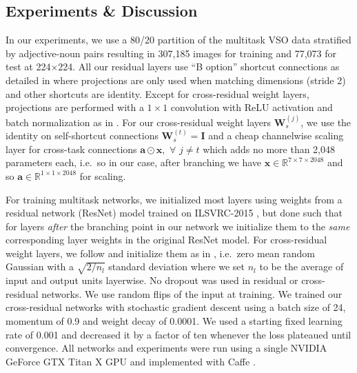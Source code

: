 \documentclass{sig-alternate-05-2015}
\newcommand{\mb}{\mathbf}
\begin{document}
\subsection{Experiments \& Discussion}
\label{ssec:experiments}

In our experiments, we use a 80/20 partition of the multitask VSO data stratified by adjective-noun pairs resulting in 307,185 images for training and 77,073 for test at 224$\times$224. %
All our residual layers use ``B option'' shortcut connections as detailed in \cite{he_2016} where projections are only used when matching dimensions (stride 2) and other shortcuts are identity.
Except for cross-residual weight layers, projections are performed with a $1\times1$ convolution with ReLU activation and batch normalization as in \cite{he_2016}.
For our cross-residual weight layers $\mb W_s^{(j)}$, we use the identity on self-shortcut connections $\mb W_s^{(t)}=\mb I$ and a cheap channelwise scaling layer for cross-task connections $\mb a\odot\mb x,\,\,\forall\,\,j\neq t$ which adds no more than 2,048 parameters each, i.e.~so in our case, after branching we have $\mb x \in \mathbb{R}^{7\times7\times2048}$ and so $\mb a \in \mathbb{R}^{1\times1\times2048}$ for scaling.

For training multitask networks, we initialized most layers using weights from a residual network (ResNet) model trained on ILSVRC-2015 \cite{imagenet}, but done such that for layers \emph{after} the branching point in our network we initialize them to the \emph{same} corresponding layer weights in the original ResNet model.
For cross-residual weight layers, we follow \cite{he_2016} and initialize them as in \cite{he_2015}, i.e.~zero mean random Gaussian with a $\sqrt{2/n_l}$ standard deviation where we set $n_l$ to be the average of input and output units layerwise.
No dropout \cite{srivastava_2014} was used in residual or cross-residual networks.
We use random flips of the input at training.
We trained our cross-residual networks with stochastic gradient descent using a batch size of 24, momentum of 0.9 and weight decay of 0.0001.
We used a starting fixed learning rate of 0.001 and decreased it by a factor of ten whenever the loss plateaued until convergence.
All networks and experiments were run using a single NVIDIA GeForce GTX Titan X GPU and implemented with Caffe \cite{jia_2014}.
\end{document}
